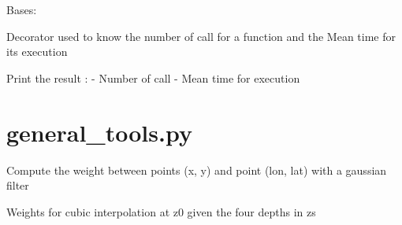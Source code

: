 \documentclass[letterpaper,10pt,english]{sphinxmanual}
\begin{document}

\begin{fulllineitems}
\label{\detokenize{pargopy:pargopy.decorator.exec_time}}
Bases: 

Decorator used to know the number of call for a function
and the Mean time for its execution

\begin{fulllineitems}
\label{\detokenize{pargopy:pargopy.decorator.exec_time.results}}
Print the result :
- Number of call
- Mean time for execution

\end{fulllineitems}


\end{fulllineitems}



\section{general\_tools.py}
\label{\detokenize{pargopy:general-tools-py}}\label{\detokenize{pargopy:module-pargopy.general_tools}}

\begin{fulllineitems}
\label{\detokenize{pargopy:pargopy.general_tools.compute_weight}}
Compute the weight between points (x, y) and point (lon, lat) with
a gaussian filter

\end{fulllineitems}


\begin{fulllineitems}
\label{\detokenize{pargopy:pargopy.general_tools.cubiccoef}}
Weights for cubic interpolation at z0 given the four depths in zs

\end{fulllineitems}
\end{document}
